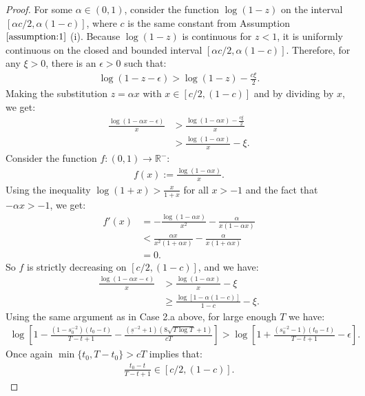 \begin{proof}
For some $\alpha \in (0,1)$, consider the function $\log(1 - z)$ on the interval $[\alpha c/2, \alpha (1-c)]$, where $c$ is the same constant from Assumption $\ref{assumption:1}$ (i). Because $\log(1 - z)$ is continuous for $z < 1$, it is uniformly continuous on the closed and bounded interval $[\alpha c/2, \alpha (1-c)]$. Therefore, for any $\xi > 0$, there is an $\epsilon > 0$ such that:
\begin{align*}
     \log(1 - z - \epsilon) > \log(1 - z) - \frac{c \xi}{2}.
\end{align*}
Making the substitution $z = \alpha x$ with $x \in [c/2, (1-c)]$ and by dividing by $x$, we get:
\begin{align*}
     \frac{\log(1 - \alpha x - \epsilon)}{x} &> \frac{\log(1 - \alpha x) -\frac{c \xi}{2}}{x} \\
     &> \frac{\log(1 - \alpha x)}{x} - \xi. \tag{$x \geq c/2$}
\end{align*}
Consider the function $f: (0,1) \to \mathbb{R}^-$:
\begin{align*}
    f(x) := \frac{\log(1 - \alpha x)}{x}.
\end{align*}
Using the inequality $\log(1+x) > \frac{x}{1+x}$ for all $x > - 1$ and the fact that $-\alpha x > -1$, we get:
\begin{align*}
    f'(x) &= -\frac{\log(1 - \alpha x)}{x^2} - \frac{\alpha}{x(1 - \alpha x)} \\
    &< \frac{\alpha x }{x^2(1+\alpha x)} - \frac{\alpha}{x(1 + \alpha x)} \\
    &= 0.
\end{align*}
So $f$ is strictly decreasing on $[c/2, (1-c)]$, and we have:
\begin{align*}
     \frac{\log(1 - \alpha x - \epsilon)}{x} &> \frac{\log(1 - \alpha x)}{x} - \xi \\
     &\geq \frac{\log[1 - \alpha (1-c)]}{1-c} - \xi.
\end{align*}
Using the same argument as in Case 2.a above, for large enough $T$ we have:
\begin{align*}
     \log\left[1 - \frac{\left(1- s_0^{-2}\right)(t_0 - t)}{T - t + 1} -  \frac{(\underline{s}^{-2} + 1)\left(8\sqrt{T\log T} +1\right)}{cT}\right] > \log\left[1 + \frac{\left(s_0^{-2} -1\right)(t_0 - t)}{T - t + 1} - \epsilon\right].
\end{align*}
Once again $\min\{t_0,T-t_0\} > cT$ implies that: 
\begin{align*}
    \frac{t_0 - t}{T - t + 1} \in [c/2, (1-c)].
\end{align*}

\end{proof}
